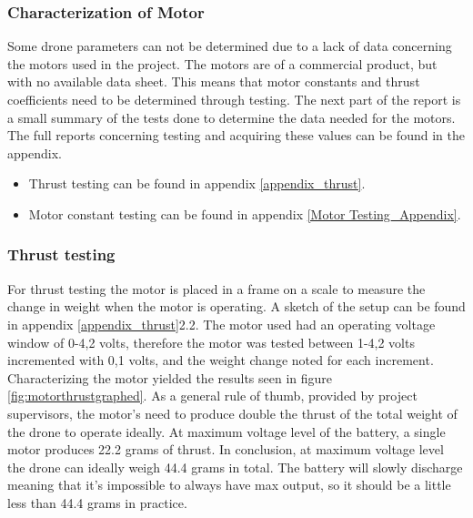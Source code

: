 \subsubsection{Characterization of Motor}
Some drone parameters can not be determined due to a lack of data concerning the motors used in the project. The motors are of a commercial product, but with no available data sheet. This means that motor constants and thrust coefficients need to be determined through testing. 
The next part of the report is a small summary of the tests done to determine the data needed for the motors. The full reports concerning testing and acquiring these values can be found in the appendix. 
\begin{itemize}
    \item Thrust testing can be found in appendix \ref{appendix_thrust}.
    \item Motor constant testing can be found in appendix \ref{Motor Testing_Appendix}.
\end{itemize}

\subsubsection{Thrust testing}

For thrust testing the motor is placed in a frame on a scale to measure the change in weight when the motor is operating. A sketch of the setup can be found in appendix \ref{appendix_thrust}2.2. The motor used had an operating voltage window of 0-4,2 volts, therefore the motor was tested between 1-4,2 volts incremented with 0,1 volts, and the weight change noted for each increment. Characterizing the motor yielded the results seen in figure \ref{fig:motorthrustgraphed}. As a general rule of thumb, provided by project supervisors, the motor's need to produce double the thrust of the total weight of the drone to operate ideally. At maximum voltage level of the battery, a single motor produces 22.2 grams of thrust. In conclusion, at maximum voltage level the drone can ideally weigh 44.4 grams in total. The battery will slowly discharge meaning that it's impossible to always have max output, so it should be a little less than 44.4 grams in practice.

